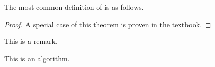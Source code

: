 The most common definition of  is as follows.


\begin{proof}
    A special case of this theorem is proven in the textbook.
\end{proof}

\begin{remark}
    This is a remark.
\end{remark}

\begin{algorithm}
    This is an algorithm.
\end{algorithm}

\clearpage